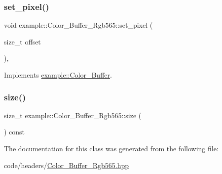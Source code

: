 \subsubsection{\texorpdfstring{set\_pixel()}{set\_pixel()}\hspace{0.1cm}{\footnotesize\ttfamily [2/2]}}
{\footnotesize\ttfamily void example\+::\+Color\+\_\+\+Buffer\+\_\+\+Rgb565\+::set\+\_\+pixel (\begin{DoxyParamCaption}\item[{size\+\_\+t}]{offset }\end{DoxyParamCaption})\hspace{0.3cm}{\ttfamily [inline]}, {\ttfamily [virtual]}}



Implements \mbox{\hyperlink{classexample_1_1_color___buffer_a1c919e629ef74e418e1ad416d0a5e85a}{example\+::\+Color\+\_\+\+Buffer}}.

\mbox{\label{classexample_1_1_color___buffer___rgb565_a06c7547d382ceba07f96f0b8841c35de}} 
\subsubsection{\texorpdfstring{size()}{size()}}
{\footnotesize\ttfamily size\+\_\+t example\+::\+Color\+\_\+\+Buffer\+\_\+\+Rgb565\+::size (\begin{DoxyParamCaption}{ }\end{DoxyParamCaption}) const\hspace{0.3cm}{\ttfamily [inline]}}



The documentation for this class was generated from the following file\+:\begin{DoxyCompactItemize}
\item 
code/headers/\mbox{\hyperlink{_color___buffer___rgb565_8hpp}{Color\+\_\+\+Buffer\+\_\+\+Rgb565.\+hpp}}\end{DoxyCompactItemize}

